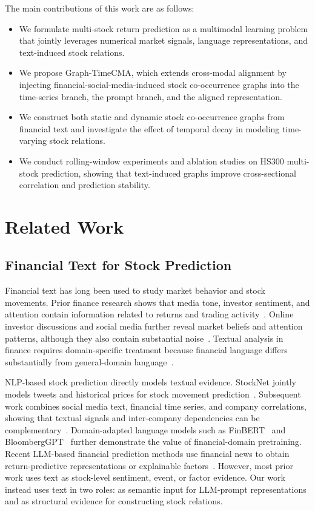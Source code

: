 \documentclass[runningheads]{llncs}
\begin{document}
The main contributions of this work are as follows:
\begin{itemize}
    \item We formulate multi-stock return prediction as a multimodal learning problem that jointly leverages numerical market signals, language representations, and text-induced stock relations.
    \item We propose Graph-TimeCMA, which extends cross-modal alignment by injecting financial-social-media-induced stock co-occurrence graphs into the time-series branch, the prompt branch, and the aligned representation.
    \item We construct both static and dynamic stock co-occurrence graphs from financial text and investigate the effect of temporal decay in modeling time-varying stock relations.
    \item We conduct rolling-window experiments and ablation studies on HS300 multi-stock prediction, showing that text-induced graphs improve cross-sectional correlation and prediction stability.
\end{itemize}

\section{Related Work}

\subsection{Financial Text for Stock Prediction}

Financial text has long been used to study market behavior and stock movements. Prior finance research shows that media tone, investor sentiment, and attention contain information related to returns and trading activity~\cite{tetlock2007giving,loughran2011liability,loughran2016survey}. Online investor discussions and social media further reveal market beliefs and attention patterns, although they also contain substantial noise~\cite{antweiler2004noise,chen2014wisdom}. Textual analysis in finance requires domain-specific treatment because financial language differs substantially from general-domain language~\cite{loughran2016survey}.

NLP-based stock prediction directly models textual evidence. StockNet jointly models tweets and historical prices for stock movement prediction~\cite{xu2018stocknet}. Subsequent work combines social media text, financial time series, and company correlations, showing that textual signals and inter-company dependencies can be complementary~\cite{sawhney2020deep}. Domain-adapted language models such as FinBERT~\cite{araci2019finbert} and BloombergGPT~\cite{wu2023bloomberggpt} further demonstrate the value of financial-domain pretraining. Recent LLM-based financial prediction methods use financial news to obtain return-predictive representations or explainable factors~\cite{guo2024finetuning,wang2024llmfactor}. However, most prior work uses text as stock-level sentiment, event, or factor evidence. Our work instead uses text in two roles: as semantic input for LLM-prompt representations and as structural evidence for constructing stock relations.
\end{document}
